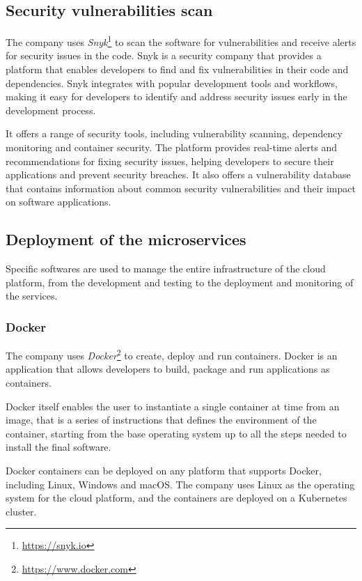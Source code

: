 \subsection{Security vulnerabilities scan}

The company uses \textit{Snyk}\footnote{\url{https://snyk.io}} to scan the software for vulnerabilities and receive alerts for security issues in the code. Snyk is a security company that provides a platform that enables developers to find and fix vulnerabilities in their code and dependencies. Snyk integrates with popular development tools and workflows, making it easy for developers to identify and address security issues early in the development process.

It offers a range of security tools, including vulnerability scanning, dependency monitoring and container security. The platform provides real-time alerts and recommendations for fixing security issues, helping developers to secure their applications and prevent security breaches. It also offers a vulnerability database that contains information about common security vulnerabilities and their impact on software applications.

\subsection{Deployment of the microservices}

Specific softwares are used to manage the entire infrastructure of the cloud platform, from the development and testing to the deployment and monitoring of the services.

\subsubsection{Docker}

The company uses \textit{Docker}\footnote{\url{https://www.docker.com}} to create, deploy and run containers. Docker is an application that allows developers to build, package and run applications as containers.

Docker itself enables the user to instantiate a single container at time from an image, that is a series of instructions that defines the environment of the container, starting from the base operating system up to all the steps needed to install the final software.

Docker containers can be deployed on any platform that supports Docker, including Linux, Windows and macOS. The company uses Linux as the operating system for the cloud platform, and the containers are deployed on a Kubernetes cluster.

